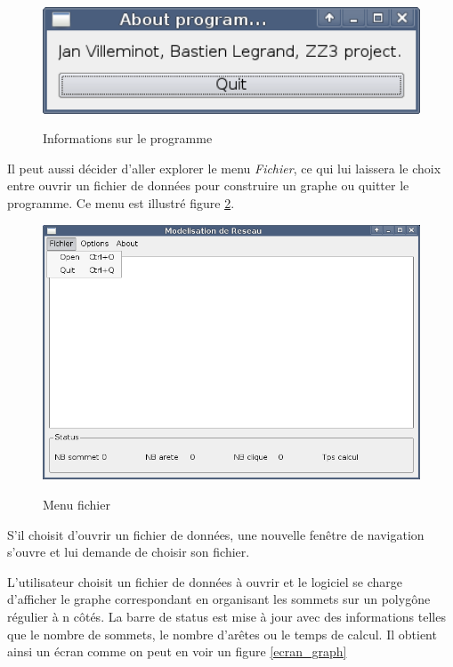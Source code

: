 \begin{figure}[H]
\centering
 \fbox
 {
 \includegraphics[width=16cm]{./schema/capture_ecran_about.png}
 }
  \caption{\label{ecran_about}Informations sur le programme}
\end{figure}

\par
Il peut aussi d\'ecider d'aller explorer le menu \textit{Fichier}, ce qui lui laissera le choix entre ouvrir un fichier de donn\'ees pour construire un graphe ou quitter le programme. Ce menu est illustr\'e figure \ref{ecran_fichier}.

\begin{figure}[H]
\centering
 \fbox
 {
 \includegraphics[width=16cm]{./schema/capture_ecran_fichier.png}
 }
  \caption{\label{ecran_fichier}Menu fichier}
\end{figure}

S'il choisit d'ouvrir un fichier de donn\'ees, une nouvelle fen\^etre de navigation s'ouvre et lui demande de choisir son fichier.

L'utilisateur choisit un fichier de donn\'ees \`a ouvrir et le logiciel se charge d'afficher le graphe correspondant en organisant les sommets sur un polyg\^one r\'egulier \`a n c\^ot\'es.
La barre de status est mise \`a jour avec des informations telles que le nombre de sommets, le nombre d'ar\^etes ou le temps de calcul. Il obtient ainsi un \'ecran comme on peut en voir un figure \ref{ecran_graph}

